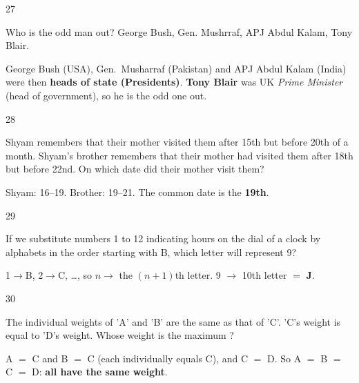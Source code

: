\begin{question}{27}
{Who is the odd man out? George Bush, Gen. Mushrraf, APJ Abdul Kalam, Tony Blair.\par}
\begin{explain}
George Bush (USA), Gen.\ Musharraf (Pakistan) and APJ Abdul Kalam (India) were then \textbf{heads of state (Presidents)}. \textbf{Tony Blair} was UK \emph{Prime Minister} (head of government), so he is the odd one out.
\end{explain}
\end{question}

\begin{question}{28}
{Shyam remembers that their mother visited them after 15th but before 20th of a month. Shyam's brother remembers that their mother had visited them after 18th but before 22nd. On which date did their mother visit them?\par}
\begin{explain}
Shyam: 16--19. Brother: 19--21. The common date is the \textbf{19th}.
\end{explain}
\end{question}

\begin{question}{29}
{If we substitute numbers 1 to 12 indicating hours on the dial of a clock by alphabets in the order starting with B, which letter will represent 9?\par}
\begin{explain}
1$\rightarrow$B, 2$\rightarrow$C, \ldots, so $n\rightarrow$ the $(n+1)$th letter. 9 $\rightarrow$ 10th letter $=$ \textbf{J}.
\end{explain}
\end{question}

\begin{question}{30}
{The individual weights of 'A' and 'B' are the same as that of 'C'. 'C's weight is equal to 'D's weight. Whose weight is the maximum ?\par}
\begin{explain}
A $=$ C and B $=$ C (each individually equals C), and C $=$ D. So A $=$ B $=$ C $=$ D: \textbf{all have the same weight}.
\end{explain}
\end{question}

